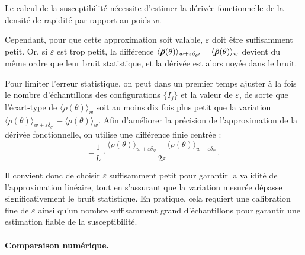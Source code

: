 Le calcul de la susceptibilité nécessite d’estimer la dérivée fonctionnelle de la densité de rapidité par rapport au poids \( w \). 

Cependant, pour que cette approximation soit valable, \( \varepsilon \) doit être suffisamment petit. Or, si \( \varepsilon \) est trop petit, la différence  \( \langle \hat{\bm{\rho}}(\theta) \rangle_{w + \varepsilon \delta_{\theta'}} -  \langle\hat{\bm{\rho}} (\theta) \rangle_w \) devient du même ordre que leur bruit statistique, et la dérivée est alors noyée dans le bruit.

Pour limiter l'erreur statistique, on peut dans un premier temps ajuster à la fois le nombre d’échantillons des configurations \( \{I_j\} \) et la valeur de \( \varepsilon \), de sorte que l’écart-type de \( \langle \rho(\theta) \rangle_w \) soit au moins dix fois plus petit que la variation 
\(
\langle \rho(\theta) \rangle_{w + \varepsilon \delta_{\theta'}} - \langle \rho(\theta) \rangle_w.
\)
Afin d'améliorer la précision de l'approximation de la dérivée fonctionnelle, on utilise une différence finie centrée :
\begin{equation}
	-\frac{1}{L} \cdot \frac{ \langle \rho(\theta) \rangle_{w + \varepsilon \delta_{\theta'}} - \langle \rho(\theta) \rangle_{w - \varepsilon \delta_{\theta'}} }{2 \varepsilon}.
\end{equation}

Il convient donc de choisir \( \varepsilon \) suffisamment petit pour garantir la validité de l'approximation linéaire, tout en s'assurant que la variation mesurée dépasse significativement le bruit statistique. En pratique, cela requiert une calibration fine de \( \varepsilon \) ainsi qu’un nombre suffisamment grand d’échantillons pour garantir une estimation fiable de la susceptibilité.


\paragraph{Comparaison numérique.}
%

